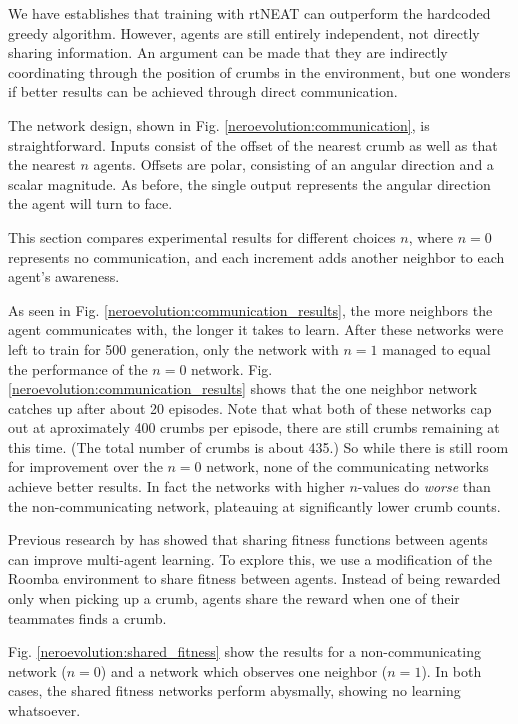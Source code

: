 \documentclass[conference]{IEEEtran}
\begin{document}
We have establishes that training with rtNEAT can outperform the hardcoded greedy algorithm. However, agents are still entirely independent, not directly sharing information. An argument can be made that they are indirectly coordinating through the position of crumbs in the environment, but one wonders if better results can be achieved through direct communication.

The network design, shown in Fig. \ref{neroevolution:communication}, is straightforward. Inputs consist of the offset of the nearest crumb as well as that the nearest $n$ agents. Offsets are polar, consisting of an angular direction and a scalar magnitude. As before, the single output represents the angular direction the agent will turn to face. 

This section compares experimental results for different choices $n$, where $n=0$ represents no communication, and each increment adds another neighbor to each agent's awareness.

As seen in Fig. \ref{neroevolution:communication_results}, the more neighbors the agent communicates with, the longer it takes to learn. After these networks were left to train for 500 generation, only the network with $n=1$ managed to equal the performance of the $n=0$ network. Fig. \ref{neroevolution:communication_results} shows that the one neighbor network catches up after about 20 episodes. Note that what both of these networks cap out at aproximately 400 crumbs per episode, there are still crumbs remaining at this time. (The total number of crumbs is about 435.) So while there is still room for improvement over the $n=0$ network, none of the communicating networks achieve better results. In fact the networks with higher $n$-values do \textit{worse} than the non-communicating network, plateauing at significantly lower crumb counts.

Previous research by \cite{rajagopalan2011role} has showed that sharing fitness functions between agents can improve multi-agent learning. 
To explore this, we use a modification of the Roomba environment to share fitness between agents. Instead of being rewarded only when picking up a crumb, agents share the reward when one of their teammates finds a crumb. 

Fig. \ref{neroevolution:shared_fitness} show the results for a non-communicating network ($n=0$) and a network which observes one neighbor ($n=1$). In both cases, the shared fitness networks perform abysmally, showing no learning whatsoever.
\end{document}
